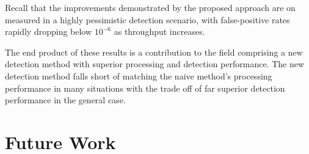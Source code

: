 \documentclass{llncs}
\begin{document}
%
%

Recall that the improvements demonstrated by the proposed approach are on
measured in a highly pessimistic detection scenario, with false-positive rates
rapidly dropping below $10^{-6}$ as throughput increases.

The end product of these results is a contribution to the field comprising a new
detection method with superior processing and detection performance. The new
detection method falls short of matching the naive method's processing
performance in many situations with the trade off of far superior detection
performance in the general case.

\section{Future Work}
\end{document}
